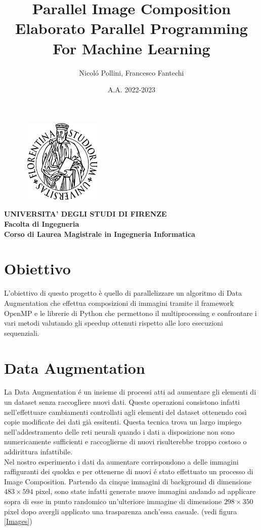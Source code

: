 \documentclass{article}
\title{\LARGE Parallel Image Composition \\
\large Elaborato Parallel Programming For Machine Learning}
\author{Nicol\'o Pollini, Francesco Fantechi}
\date{A.A. 2022-2023}
\begin{document}
\maketitle

\begin{figure}[!h]
\centering
\includegraphics[width=4cm, height=4cm]{"Immagini/LogoUnifi.PNG"}
\end{figure}

\begin{center}
\textbf{\large UNIVERSITA' DEGLI STUDI DI FIRENZE \\
Facolta di Ingegneria \\
\normalsize Corso di Laurea Magistrale in Ingegneria Informatica}
\end{center}


\newpage

\tableofcontents

\newpage

\section{Obiettivo}

L'obiettivo di questo progetto è quello di parallelizzare un algoritmo di Data Augmentation che effettua composizioni di immagini tramite il framework OpenMP e le librerie di Python che permettono il multiprocessing e confrontare i vari metodi valutando gli speedup ottenuti rispetto alle loro esecuzioni sequenziali.

\section{Data Augmentation}

La Data Augmentation \'e un insieme di processi atti ad aumentare gli elementi di un dataset senza raccogliere nuovi dati. Queste operazioni consistono infatti nell'effettuare cambiamenti controllati agli elementi del dataset ottenendo così copie modificate dei dati già essitenti. Questa tecnica trova un largo impiego nell'addestramento delle reti neurali quando i dati a disposizione non sono numericamente sufficienti e raccoglierne di nuovi risulterebbe troppo costoso o addirittura infattibile.\\
Nel nostro esperimento i dati da aumentare corrispondono a delle immagini raffiguranti dei quokka e per ottenerne di nuovi \'e stato effettuato un processo di Image Composition. Partendo da cinque immagini di background di dimensione $ 483\times594 $ pixel, sono state infatti generate nuove immagini andando ad applicare sopra di esse in punto randomico un'ulteriore immagine di dimensione $ 298\times350 $ pixel dopo avergli applicato una trasparenza anch'essa casuale. (vedi figura \ref{Images})  
\end{document}
